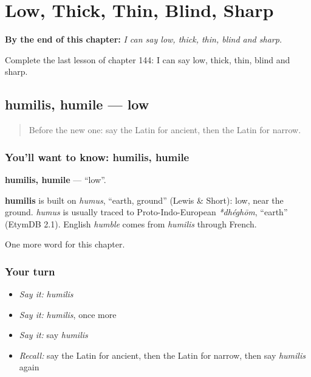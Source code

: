 
\chapter{Low, Thick, Thin, Blind, Sharp}
\label{ch:la-low-thick-thin-blind-sharp}

\begin{chapteropening}
\textbf{By the end of this chapter:} \emph{I can say low, thick, thin, blind and sharp.}

Complete the last lesson of chapter 144: I can say low, thick, thin, blind and sharp.
\end{chapteropening}

\section[humilis, humile]{humilis, humile — low}

\label{lesson:LA-C144-humilis}



\begin{quote}
Before the new one: say the Latin for ancient, then the Latin for narrow.
\end{quote}

\subsection*{You'll want to know: humilis, humile}
\textbf{humilis, humile} — \textquotedblleft{}low\textquotedblright{}.

\begin{cousinweb}
\textbf{humilis} is built on \emph{humus}, \textquotedblleft{}earth, ground\textquotedblright{} (Lewis \& Short): low, near the ground. \emph{humus} is usually traced to Proto-Indo-European \emph{*dhéghōm}, \textquotedblleft{}earth\textquotedblright{} (EtymDB 2.1). English \emph{humble} comes from \emph{humilis} through French.
\end{cousinweb}

\begin{grammarlens}[title={What you've built}]
One more word for this chapter.
\end{grammarlens}

\subsection*{Your turn}
\begin{itemize}
\raggedright
  \item \emph{Say it:} \emph{humilis}
  \item \emph{Say it:} \emph{humilis}, once more
  \item \emph{Say it:} say \emph{humilis}
  \item \emph{Recall:} say the Latin for ancient, then the Latin for narrow, then say \emph{humilis} again
\end{itemize}


